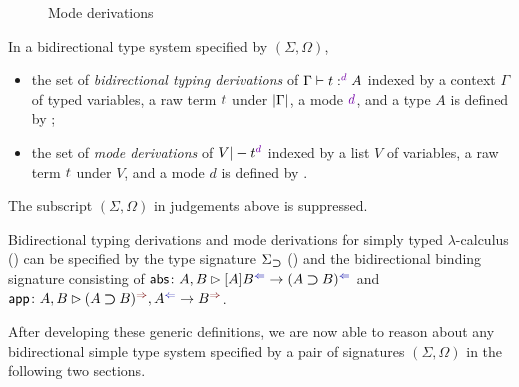 \begin{definition}
\begin{figure}
    \caption{Mode derivations}
    \label{fig:mode-derivations}
  \end{figure}
  In a bidirectional type system specified by $(\Sigma, \Omega)$,
  \begin{itemize}
    \item the set of \emph{bidirectional typing derivations} of $\Gamma \vdash t :^\dir{d} A$ indexed by a context $\Gamma$ of typed variables, a raw term $\isTerm{t}$ under $\left|\Gamma\right|$, a mode $\dir{d}$, and a type $A$ is defined by ;
    \item the set of \emph{mode derivations} of $V |- t^\dir{d}$ indexed by a list $V$ of variables, a raw term $\isTerm{t}$ under $V$, and a mode $d$ is defined by .
  \end{itemize}
  The subscript $(\Sigma, \Omega)$ in judgements above is suppressed.
\end{definition}

\begin{example}
  Bidirectional typing derivations and mode derivations for simply typed $\lambda$-calculus () can be specified by the type signature $\Sigma_{\mathbin{\bm{\supset}}}$ () and the bidirectional binding signature consisting of $\mathsf{abs}\colon A , B \rhd [A]B^{\chk} \to (A \bto B)^{\chk}$ and $\mathsf{app}\colon A, B \rhd (A \bto B)^{\syn}, A^{\chk} \to B^{\syn}$.
\end{example}

After developing these generic definitions, we are now able to reason about any bidirectional simple type system specified by a pair of signatures $(\Sigma, \Omega)$ in the following two sections.
